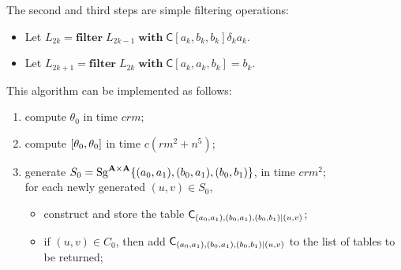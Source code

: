 The second and third steps are simple filtering operations:
\begin{itemize}
  \item Let $L_{2k} = \mathbf{filter}\; L_{2k-1} \; \mathbf{with} \; \mathsf{C}[a_k, b_k, b_k] \mathrel{\delta_{k}} a_k$.
  \item Let $L_{2k+1} = \mathbf{filter} \; L_{2k} \; \mathbf{with} \; \mathsf{C}[a_k, a_k, b_k] = b_k$.
\end{itemize}

This algorithm can be implemented as follows:
 \begin{enumerate}
\item compute $\theta_0$ in time $crm$;
\item compute $[ \theta_0 ,  \theta_0 ]$ in time $c(rm^2 + n^5)$;
\item generate $S_0=\operatorname{Sg}^{\mathbf{A}\times \mathbf{A}} \{(a_0,a_1),(b_0,a_1),(b_0,b_1)\}$,
  in time $c r m^2$;\\
for each newly generated $(u,v) \in S_0$,
  \begin{itemize}
  \item construct and store the table
    $\mathsf{C}_{(a_0,a_1),(b_0,a_1),(b_0,b_1)|(u,v)}$;
  \item if $(u,v) \in C_0$, then add $\mathsf{C}_{(a_0,a_1),(b_0,a_1),(b_0,b_1)|(u,v)}$
   to the list of tables to be returned;
  \end{itemize}
\end{enumerate}






















